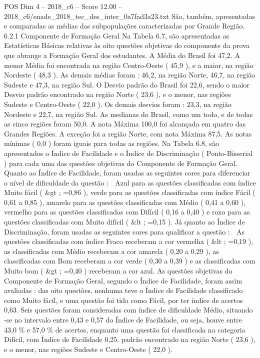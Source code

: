 \begin{textsample}{POS Dim 4 – 2018\_c6 – Score 12.00 – 2018\_c6/enade\_2018\_tec\_des\_inter\_0a7fad3a23.txt}
São, também, apresentadas e comparadas as médias das subpopulações caracterizadas por Grande Região. 6.2.1 Componente de Formação Geral Na Tabela 6.7, são apresentadas as Estatísticas Básicas relativas às oito questões objetivas do componente da prova que abrange a Formação Geral dos estudantes.
A Média do Brasil foi 47,2.
A menor Média foi encontrada na região Centro-Oeste ( 45,9 ), e a maior, na região Nordeste ( 48,3 ).
As demais médias foram : 46,2, na região Norte, 46,7, na região Sudeste e 47,3, na região Sul.
O Desvio padrão do Brasil foi 22,6, sendo o maior Desvio padrão encontrado na região Norte ( 23,6 ), e o menor, nas regiões Sudeste e Centro-Oeste ( 22,0 ).
Os demais desvios foram : 23,3, na região Nordeste e 22,7, na região Sul.
As medianas do Brasil, como um todo, e de todas as cinco regiões foram 50,0.
A nota Máxima 100,0 foi alcançada em quatro das Grandes Regiões.
A exceção foi a região Norte, com nota Máxima 87,5.
As notas mínimas ( 0,0 ) foram iguais para todas as regiões.
Na Tabela 6.8, são apresentados o Índice de Facilidade e o Índice de Discriminação ( Ponto-Bisserial ) para cada uma das questões objetivas do Componente de Formação Geral.
Quanto ao Índice de Facilidade, foram usadas as seguintes cores para diferenciar o nível de dificuldade da questão :  Azul para as questões classificadas com índice Muito fácil ( \&gt ; =0,86 ), verde para as questões classificadas com índice Fácil ( 0,61 a 0,85 ), amarelo para as questões classificadas com Médio ( 0,41 a 0,60 ), vermelho para as questões classificadas com Difícil ( 0,16 a 0,40 ) e roxo para as questões classificadas com Muito difícil ( \&lt ; =0,15 ).
Já quanto ao Índice de Discriminação, foram usadas as seguintes cores para qualificar a questão :  As questões classificadas com índice Fraco receberam a cor vermelha ( \&lt ; =0,19 ), as classificadas com Médio receberam a cor amarela ( 0,20 a 0,29 ), as classificadas com Bom receberam a cor verde ( 0,30 a 0,39 ) e as classificadas com Muito bom ( \&gt ; =0,40 ) receberam a cor azul.
As questões objetivas do Componente de Formação Geral, segundo o Índice de Facilidade, foram assim avaliadas : das oito questões, nenhuma teve o Índice de Facilidade classificado como Muito fácil, e uma questão foi tida como Fácil, por ter índice de acertos 0,63.
Seis questões foram consideradas com índice de dificuldade Médio, situando -se no intervalo entre 0,43 e 0,57 do Índice de Facilidade, ou seja, houve entre 43,0 \% e 57,0 \% de acertos, enquanto uma questão foi classificada na categoria Difícil, com Índice de Facilidade 0,25. padrão encontrado na região Norte ( 23,6 ), e o menor, nas regiões Sudeste e Centro-Oeste ( 22,0 ).

\end{textsample}
